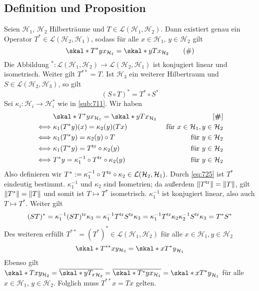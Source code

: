 \subsection[Definition und Proposition: Der zu $T \in \mathcal{L}(\mathcal{H}_1, \mathcal{H}_2)$ adjungierte Operator $T^*$]{Definition und Proposition} %
\label{sub:725}
Seien $\mathcal{H}_1$, $\mathcal{H}_2$ Hilberträume und $T \in \mathcal{L}(\mathcal{H}_1, \mathcal{H_2})$. Dann existiert genau ein Operator 
$T^* \in \mathcal{L}(\mathcal{H}_2, \mathcal{H}_1)$, sodass für alle $x \in \mathcal{H}_1$, $y \in \mathcal{H}_2$ gilt 
\begin{equation*}
	\skal*{T^* y}{x}_{\mathcal{H}_1} = \skal*{y}{T x}_{\mathcal{H}_2} \label{eq:725} \tag{\#}
\end{equation*}
Die Abbildung ${ }^*  \colon \mathcal{L}(\mathcal{H}_1, \mathcal{H}_2) \to \mathcal{L}(\mathcal{H}_2, \mathcal{H}_1)$ ist konjugiert linear und isometrisch. Weiter gilt
$T^{**} = T$. Ist $\mathcal{H}_3$ ein weiterer Hilbertraum und $S \in \mathcal{L}(\mathcal{H}_2, \mathcal{H}_3)$, so gilt
\[
	(S \circ T)^* = T^* \circ S^*
\]
Sei $\kappa_i \colon \mathcal{H}_i \to \mathcal{H}_i^*$ wie in \ref{sub:711}. Wir haben 
\begin{align*}
	& \skal*{T^* y}{x}_{\mathcal{H}_1} = \skal*{y}{T x}_{\mathcal{H}_2} & \tag*{[\textbf{\#}]} \\
	\iff & \kappa_1(T^* y)(x) =\kappa_2(y)(T x) &\text{ für } x \in \mathcal{H}_1, y \in \mathcal{H}_2 \\
	\iff & \kappa_1(T^* y) =\kappa_2(y)\circ T & \text{ für } y \in \mathcal{H}_2\\
	\iff & \kappa_1(T^* y) = T^\tr \circ \kappa_2(y) &\text{ für } y \in \mathcal{H}_2\\
	\iff & T^* y = \kappa_1 ^{-1} \circ T^\tr \circ \kappa_2(y) &\text{ für } y \in \mathcal{H}_2
\end{align*}
Also definieren wir $T^* := \kappa_1 ^{-1} \circ T^{\mathrm{tr}} \circ \kappa_2 \in \mathcal{L}(\mathcal{H}_2, \mathcal{H}_1)$. Durch \eqref{eq:725} ist $T^*$ eindeutig bestimmt.
$\kappa_1 ^{-1}$ und $\kappa_2$ sind Isometrien; da außerdem $\norm{T^\tr}= \norm{T}$, gilt $\norm{T^*}=\norm{T}$ und somit ist $T \mapsto T^*$ isometrisch.
$\kappa_1 ^{-1}$ ist konjugiert linear, also auch $T \mapsto T^*$. Weiter gilt
\begin{align*}
	(S T)^* = \kappa_1 ^{-1} (S T)^{\mathrm{tr}} \kappa_3 = \kappa_1 ^{-1} T^{\mathrm{tr}} S^{\mathrm{tr}} \kappa_3 = \kappa_1 ^{-1} T^{\mathrm{tr}} \kappa_2 \kappa_2 ^{-1} S^{\mathrm{tr}} \kappa_3 = T^* S^*
\end{align*}
Des weiteren erfüllt $T^{**} = (T^*)^* \in \mathcal{L}(\mathcal{H}_1, \mathcal{H}_2)$ für alle $x \in \mathcal{H}_1, y \in \mathcal{H}_2$
\[
	\skal*{T^{**} x}{y}_{\mathcal{H}_2} = \skal*{x}{T^* y}_{\mathcal{H}_1}
\]
Ebenso gilt $\skal*{T x}{y}_{\mathcal{H}_2}= \overline{\skal*{y}{T_x}_{\mathcal{H}_2}} = \overline{\skal*{T^* y}{x}_{\mathcal{H}_1}} = \skal*{x}{T^* y}_{\mathcal{H}_1}$ für
alle $x \in \mathcal{H}_1$, $y \in \mathcal{H}_2$. Folglich muss $T^{**} x = T x$ gelten. \bewende 

